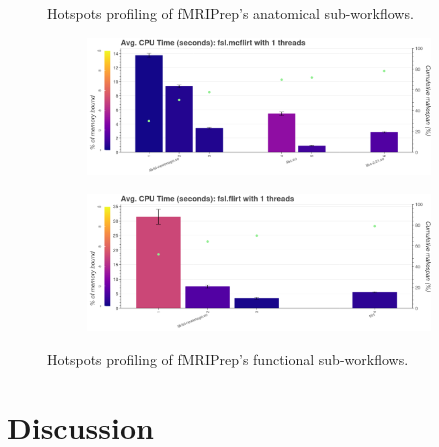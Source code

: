 \documentclass[conference]{IEEEtran}
\begin{document}
\begin{figure}[ht!]
	\caption{Hotspots profiling of fMRIPrep's anatomical sub-workflows.}
	\label{fig:hotspots-fmriprep-anat-subworkflow}
	
\end{figure}
					
\begin{figure}[ht!]
	\centering
	\begin{subfigure}[t]{0.49\textwidth}
		\caption{}
		\label{subfig:hotspots-fsl-mcflirt}
		\includegraphics[width=\textwidth]{figures/hotspots-1thread-fsl-mcflirt.png}
	\end{subfigure}
	\hfill
	\begin{subfigure}[t]{0.49\textwidth}
		\caption{}
		\label{subfig:hotspots-fsl-flirt}

		\includegraphics[width=\textwidth]{figures/hotspots-1thread-fsl-flirt.png}
	\end{subfigure}
	\caption{Hotspots profiling of fMRIPrep's functional sub-workflows.}
	\label{fig:hotspots-fmriprep-func-subworkflow}														
	
\end{figure}
					
\section{Discussion}
					
\end{document}
